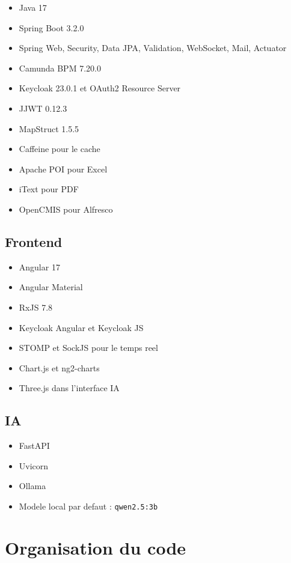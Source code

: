 \documentclass[12pt,a4paper]{article}
\begin{document}
\begin{itemize}[leftmargin=1.2cm]
  \item Java 17
  \item Spring Boot 3.2.0
  \item Spring Web, Security, Data JPA, Validation, WebSocket, Mail, Actuator
  \item Camunda BPM 7.20.0
  \item Keycloak 23.0.1 et OAuth2 Resource Server
  \item JJWT 0.12.3
  \item MapStruct 1.5.5
  \item Caffeine pour le cache
  \item Apache POI pour Excel
  \item iText pour PDF
  \item OpenCMIS pour Alfresco
\end{itemize}

\subsection{Frontend}

\begin{itemize}[leftmargin=1.2cm]
  \item Angular 17
  \item Angular Material
  \item RxJS 7.8
  \item Keycloak Angular et Keycloak JS
  \item STOMP et SockJS pour le temps reel
  \item Chart.js et ng2-charts
  \item Three.js dans l'interface IA
\end{itemize}

\subsection{IA}

\begin{itemize}[leftmargin=1.2cm]
  \item FastAPI
  \item Uvicorn
  \item Ollama
  \item Modele local par defaut : \texttt{qwen2.5:3b}
\end{itemize}

\section{Organisation du code}
\end{document}
